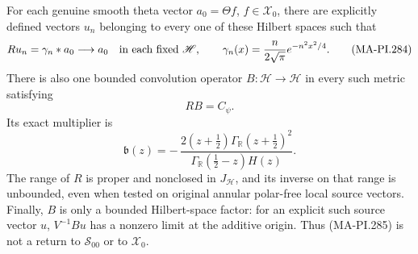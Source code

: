 For each genuine smooth theta vector \(a_0=\Theta f\),
\(f\in\mathscr X_0\), there are explicitly defined vectors
\(u_n\) belonging to every one of these Hilbert spaces such
that
\[
 Ru_n=\gamma_n*a_0\longrightarrow a_0
       \quad\hbox{in each fixed }\mathscr H,\qquad
 \gamma_n(x)=\frac{n}{2\sqrt\pi}e^{-n^2x^2/4}.
 \tag{MA-PI.284}
\]
There is also one bounded convolution operator
\(B:\mathscr H\to\mathscr H\) in every such metric satisfying
\[
                    RB=C_\psi .
 \tag{MA-PI.285}
\]
Its exact multiplier is
\[
 \mathfrak b(z)=
 -\,\frac{2(z+\tfrac12)\Gamma_{\mathbb R}(z+\tfrac12)^2}
          {\Gamma_{\mathbb R}(\tfrac12-z)H(z)}.
 \tag{MA-PI.286}
\]
The range of \(R\) is proper and nonclosed in
\(J_{\mathscr H}\), and its inverse on that range is
unbounded, even when tested on original annular polar-free
local source vectors.  Finally, \(B\) is only a bounded
Hilbert-space factor: for an explicit such source vector
\(u\), \(V^{-1}Bu\) has a nonzero limit at the additive
origin.  Thus (MA-PI.285) is not a return to
\(\mathcal S_{00}\) or to \(\mathscr X_0\).

